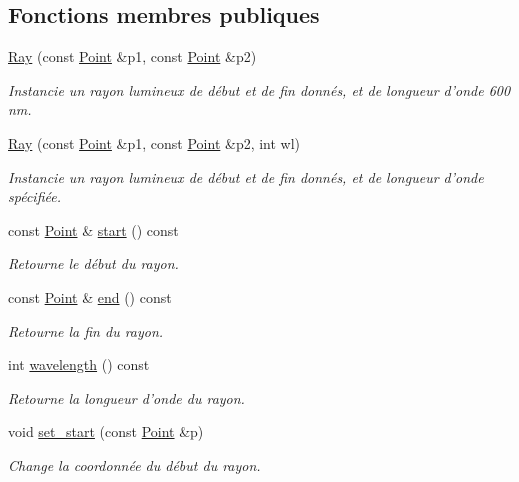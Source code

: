 \subsection*{Fonctions membres publiques}
\begin{DoxyCompactItemize}
\item 
\hyperlink{classRay_ad9f65a706bdb1ab9a85d2d4d5bcc90ae}{Ray} (const \hyperlink{classPoint}{Point} \&p1, const \hyperlink{classPoint}{Point} \&p2)
\begin{DoxyCompactList}\small\item\em Instancie un rayon lumineux de début et de fin donnés, et de longueur d'onde 600 nm. \end{DoxyCompactList}\item 
\hyperlink{classRay_ad9524414a8c37bbc36a245d7296d847e}{Ray} (const \hyperlink{classPoint}{Point} \&p1, const \hyperlink{classPoint}{Point} \&p2, int wl)
\begin{DoxyCompactList}\small\item\em Instancie un rayon lumineux de début et de fin donnés, et de longueur d'onde spécifiée. \end{DoxyCompactList}\item 
const \hyperlink{classPoint}{Point} \& \hyperlink{classRay_afb483cd8f050771fa653e01b811d9a2a}{start} () const 
\begin{DoxyCompactList}\small\item\em Retourne le début du rayon. \end{DoxyCompactList}\item 
const \hyperlink{classPoint}{Point} \& \hyperlink{classRay_a5667cdc0b8ea0e636c482342b86a2355}{end} () const 
\begin{DoxyCompactList}\small\item\em Retourne la fin du rayon. \end{DoxyCompactList}\item 
int \hyperlink{classRay_a8aa2934015c635d89ac51ac2195ae019}{wavelength} () const 
\begin{DoxyCompactList}\small\item\em Retourne la longueur d'onde du rayon. \end{DoxyCompactList}\item 
void \hyperlink{classRay_a137b80cf87ab000bcb158980ebe288f6}{set\+\_\+start} (const \hyperlink{classPoint}{Point} \&p)
\begin{DoxyCompactList}\small\item\em Change la coordonnée du début du rayon. \end{DoxyCompactList}\item 

\end{DoxyCompactItemize}
